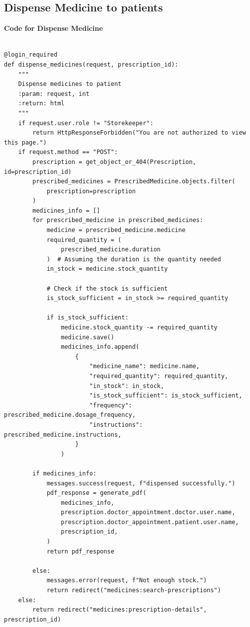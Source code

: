 \documentclass[a4paper,12pt]{article}
\begin{document}
\subsection{Dispense Medicine to patients}
\textbf{Code for Dispense Medicine}
\lstset{style=pythonSolarized}
\begin{lstlisting}

@login_required
def dispense_medicines(request, prescription_id):
    """
    Dispense medicines to patient
    :param: request, int
    :return: html
    """
    if request.user.role != "Storekeeper":
        return HttpResponseForbidden("You are not authorized to view this page.")
    if request.method == "POST":
        prescription = get_object_or_404(Prescription, id=prescription_id)
        prescribed_medicines = PrescribedMedicine.objects.filter(
            prescription=prescription
        )
        medicines_info = []
        for prescribed_medicine in prescribed_medicines:
            medicine = prescribed_medicine.medicine
            required_quantity = (
                prescribed_medicine.duration
            )  # Assuming the duration is the quantity needed
            in_stock = medicine.stock_quantity

            # Check if the stock is sufficient
            is_stock_sufficient = in_stock >= required_quantity

            if is_stock_sufficient:
                medicine.stock_quantity -= required_quantity
                medicine.save()
                medicines_info.append(
                    {
                        "medicine_name": medicine.name,
                        "required_quantity": required_quantity,
                        "in_stock": in_stock,
                        "is_stock_sufficient": is_stock_sufficient,
                        "frequency": prescribed_medicine.dosage_frequency,
                        "instructions": prescribed_medicine.instructions,
                    }
                )

        if medicines_info:
            messages.success(request, f"dispensed successfully.")
            pdf_response = generate_pdf(
                medicines_info,
                prescription.doctor_appointment.doctor.user.name,
                prescription.doctor_appointment.patient.user.name,
                prescription_id,
            )
            return pdf_response

        else:
            messages.error(request, f"Not enough stock.")
            return redirect("medicines:search-prescriptions")
    else:
        return redirect("medicines:prescription-details", prescription_id)


\end{lstlisting}
\end{document}
